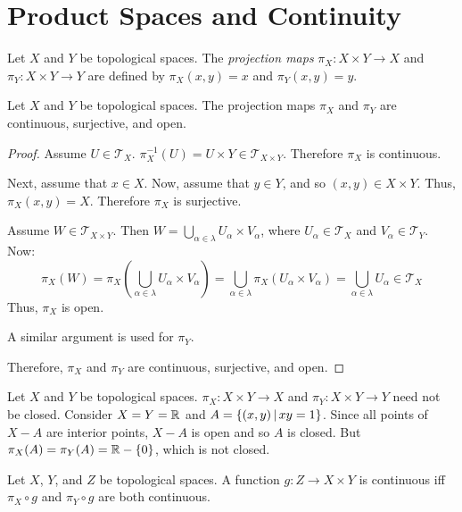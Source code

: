 \documentclass[letterpaper,12pt,fleqn]{article}
\newcommand{\T}{\mathscr{T}}
\renewcommand{\a}{\alpha}
\renewcommand{\l}{\lambda}
\begin{document}
\section*{Product Spaces and Continuity}

\begin{definition}[Projection]
  Let \(X\) and \(Y\) be topological spaces. The \emph{projection maps} \(\pi_X:X\times Y\to X\) and
  \(\pi_Y:X\times Y\to Y\) are defined by \(\pi_X(x,y)=x\) and \(\pi_Y(x,y)=y\).
\end{definition}

\begin{theorem}
  Let \(X\) and \(Y\) be topological spaces.  The projection maps \(\pi_X\) and \(\pi_Y\) are continuous,
  surjective, and open.
\end{theorem}

\begin{proof}
  Assume \(U\in\T_X\).  \(\pi_X^{-1}(U)=U\times Y\in\T_{X\times Y}\).  Therefore \(\pi_X\) is continuous.

  Next, assume that \(x\in X\).  Now, assume that \(y\in Y\), and so \((x,y)\in X\times Y\).  Thus,
  \(\pi_X(x,y)=X\).  Therefore \(\pi_X\) is surjective.

  Assume \(W\in\T_{X\times Y}\).  Then \(W=\bigcup_{\a\in\l}U_{\a}\times V_{\a}\), where \(U_{\a}\in\T_X\) and
  \(V_{\a}\in\T_Y\).  Now:
  \[\pi_X(W)=\pi_X(\bigcup_{\a\in\l}U_{\a}\times V_{\a})=\bigcup_{\a\in\l}\pi_X(U_{\a}\times V_{\a})=
  \bigcup_{\a\in\l}U_{\a}\in\T_X\]
  Thus, \(\pi_X\) is open.

  A similar argument is used for \(\pi_Y\).

  Therefore, \(\pi_X\) and \(\pi_Y\) are continuous, surjective, and open.
\end{proof}

\begin{example}
  Let \(X\) and \(Y\) be topological spaces.  \(\pi_X:X\times Y\to X\) and \(\pi_Y:X\times Y\to Y\) need not be
  closed.  Consider \(X=Y=\mathbb{R}\) and \(A=\left\{{(x,y)}\,\middle|\,{xy=1}\right\}\).  Since all points of \(X-A\) are interior points,
  \(X-A\) is open and so \(A\) is closed.  But \(\pi_X(A)=\pi_Y(A)=\mathbb{R}-\{0\}\), which is not closed.
\end{example}

\begin{theorem}
  Let \(X\), \(Y\), and \(Z\) be topological spaces.  A function \(g:Z\to X\times Y\) is continuous iff
  \(\pi_X\circ g\) and \(\pi_Y\circ g\) are both continuous.
\end{theorem}
\end{document}
